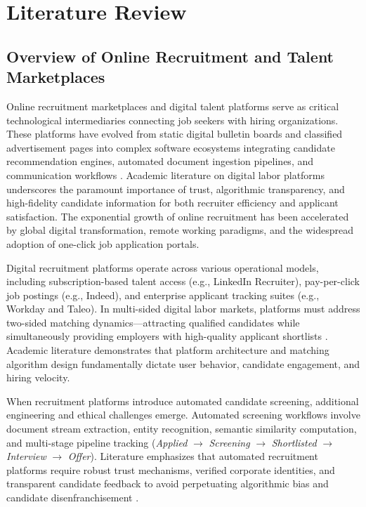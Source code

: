 \chapter{Literature Review} \label{chap:literatureReview}

\section{Overview of Online Recruitment and Talent Marketplaces}
Online recruitment marketplaces and digital talent platforms serve as critical technological intermediaries connecting job seekers with hiring organizations. These platforms have evolved from static digital bulletin boards and classified advertisement pages into complex software ecosystems integrating candidate recommendation engines, automated document ingestion pipelines, and communication workflows \cite{alotaibi2012survey}. Academic literature on digital labor platforms underscores the paramount importance of trust, algorithmic transparency, and high-fidelity candidate information for both recruiter efficiency and applicant satisfaction. The exponential growth of online recruitment has been accelerated by global digital transformation, remote working paradigms, and the widespread adoption of one-click job application portals.

Digital recruitment platforms operate across various operational models, including subscription-based talent access (e.g., LinkedIn Recruiter), pay-per-click job postings (e.g., Indeed), and enterprise applicant tracking suites (e.g., Workday and Taleo). In multi-sided digital labor markets, platforms must address two-sided matching dynamics—attracting qualified candidates while simultaneously providing employers with high-quality applicant shortlists \cite{kessler2021hiring}. Academic literature demonstrates that platform architecture and matching algorithm design fundamentally dictate user behavior, candidate engagement, and hiring velocity.

When recruitment platforms introduce automated candidate screening, additional engineering and ethical challenges emerge. Automated screening workflows involve document stream extraction, entity recognition, semantic similarity computation, and multi-stage pipeline tracking (\textit{Applied} $\rightarrow$ \textit{Screening} $\rightarrow$ \textit{Shortlisted} $\rightarrow$ \textit{Interview} $\rightarrow$ \textit{Offer}). Literature emphasizes that automated recruitment platforms require robust trust mechanisms, verified corporate identities, and transparent candidate feedback to avoid perpetuating algorithmic bias and candidate disenfranchisement \cite{parasuraman2021ats}.

